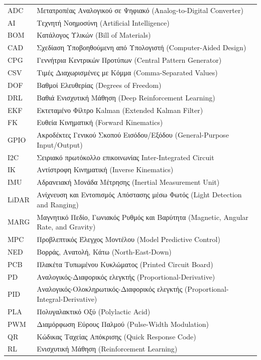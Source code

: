 \documentclass[11pt]{report}
\begin{document}
\begin{longtable}{@{}p{2.4cm}p{11cm}@{}}
ADC & Μετατροπέας Αναλογικού σε Ψηφιακό (Analog-to-Digital Converter) \\
AI & Τεχνητή Νοημοσύνη (Artificial Intelligence) \\
BOM & Κατάλογος Υλικών (Bill of Materials) \\
CAD & Σχεδίαση Υποβοηθούμενη από Υπολογιστή (Computer-Aided Design) \\
CPG & Γεννήτρια Κεντρικών Προτύπων (Central Pattern Generator) \\
CSV & Τιμές Διαχωρισμένες με Κόμμα (Comma-Separated Values) \\
DOF & Βαθμοί Ελευθερίας (Degrees of Freedom) \\
DRL & Βαθιά Ενισχυτική Μάθηση (Deep Reinforcement Learning) \\
EKF & Εκτεταμένο Φίλτρο Kalman (Extended Kalman Filter) \\
FK & Ευθεία Κινηματική (Forward Kinematics) \\
GPIO & Ακροδέκτες Γενικού Σκοπού Εισόδου/Εξόδου (General-Purpose Input/Output) \\
I2C & Σειριακό πρωτόκολλο επικοινωνίας Inter-Integrated Circuit \\
IK & Αντίστροφη Κινηματική (Inverse Kinematics) \\
IMU & Αδρανειακή Μονάδα Μέτρησης (Inertial Measurement Unit) \\
LiDAR & Ανίχνευση και Εντοπισμός Απόστασης μέσω Φωτός (Light Detection and Ranging) \\
MARG & Μαγνητικό Πεδίο, Γωνιακός Ρυθμός και Βαρύτητα (Magnetic, Angular Rate, and Gravity) \\
MPC & Προβλεπτικός Έλεγχος Μοντέλου (Model Predictive Control) \\
NED & Βορράς, Ανατολή, Κάτω (North-East-Down) \\
PCB & Πλακέτα Τυπωμένου Κυκλώματος (Printed Circuit Board) \\
PD & Αναλογικός-Διαφορικός ελεγκτής (Proportional-Derivative) \\
PID & Αναλογικός-Ολοκληρωτικός-Διαφορικός ελεγκτής (Proportional-Integral-Derivative) \\
PLA & Πολυγαλακτικό Οξύ (Polylactic Acid) \\
PWM & Διαμόρφωση Εύρους Παλμού (Pulse-Width Modulation) \\
QR & Κώδικας Ταχείας Απόκρισης (Quick Response Code) \\
RL & Ενισχυτική Μάθηση (Reinforcement Learning) \\

\end{longtable}
\end{document}
